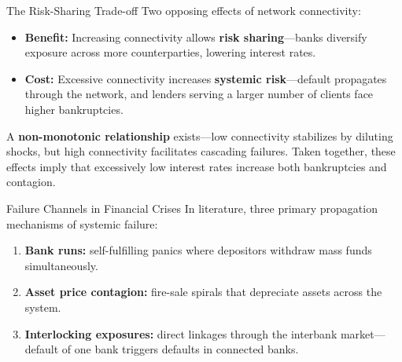 \begin{frame}{The Risk-Sharing Trade-off}
  Two opposing effects of network connectivity:
  \begin{itemize}
    \item \textbf{Benefit:} Increasing connectivity allows \textbf{risk sharing}---banks diversify exposure across more counterparties, lowering interest rates.
    \item \textbf{Cost:} Excessive connectivity increases \textbf{systemic risk}---default propagates through the network, and lenders serving a larger number of clients face higher bankruptcies.
  \end{itemize}
  A \textbf{non-monotonic relationship} exists---low connectivity stabilizes by diluting shocks, but high connectivity facilitates cascading failures. Taken together, these effects imply that excessively low interest rates increase both bankruptcies and contagion.
\end{frame}


\begin{frame}{Failure Channels in Financial Crises}
  In literature, three primary propagation mechanisms of systemic failure:
  \begin{enumerate}
    \item \textbf{Bank runs:} self-fulfilling panics where depositors withdraw mass funds simultaneously.
    \item \textbf{Asset price contagion:} fire-sale spirals that depreciate assets across the system.
    \item \textbf{Interlocking exposures:} direct linkages through the interbank market---default of one bank triggers defaults in connected banks.
  \end{enumerate}
\end{frame}

